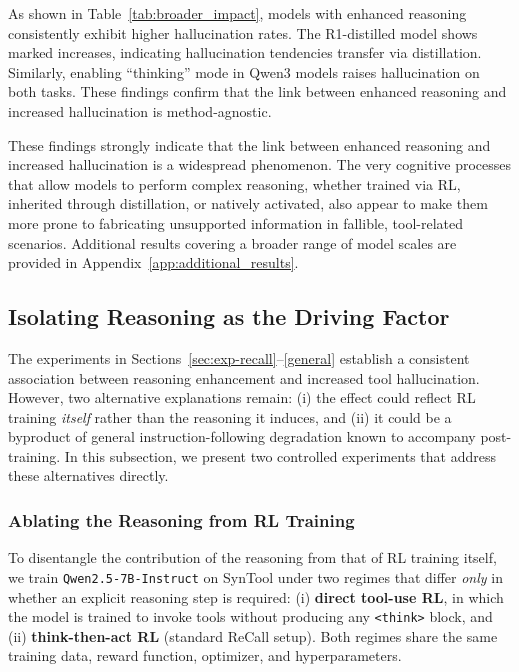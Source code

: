 \documentclass[11pt]{article}
\begin{document}
As shown in Table~\ref{tab:broader_impact}, models with enhanced reasoning consistently exhibit higher hallucination rates. The R1-distilled model shows marked increases, indicating hallucination tendencies transfer via distillation. Similarly, enabling ``thinking'' mode in Qwen3 models raises hallucination on both tasks. These findings confirm that the link between enhanced reasoning and increased hallucination is method-agnostic.

These findings strongly indicate that the link between enhanced reasoning and increased hallucination is a widespread phenomenon. The very cognitive processes that allow models to perform complex reasoning, whether trained via RL, inherited through distillation, or natively activated, also appear to make them more prone to fabricating unsupported information in fallible, tool-related scenarios. Additional results covering a broader range of model scales are provided in Appendix~\ref{app:additional_results}.

\subsection{Isolating Reasoning as the Driving Factor}
\label{sec:isolating}

The experiments in Sections~\ref{sec:exp-recall}--\ref{general} establish a consistent association between reasoning enhancement and increased tool hallucination. However, two alternative explanations remain: (i) the effect could reflect RL training \emph{itself} rather than the reasoning it induces, and (ii) it could be a byproduct of general instruction-following degradation known to accompany post-training. In this subsection, we present two controlled experiments that address these alternatives directly.

\subsubsection{Ablating the Reasoning from RL Training}
\label{sec:no-think-ablation}

To disentangle the contribution of the reasoning from that of RL training itself, we train \texttt{Qwen2.5-7B-Instruct} on SynTool under two regimes that differ \emph{only} in whether an explicit reasoning step is required: (i) \textbf{direct tool-use RL}, in which the model is trained to invoke tools without producing any \texttt{<think>} block, and (ii) \textbf{think-then-act RL} (standard ReCall setup). Both regimes share the same training data, reward function, optimizer, and hyperparameters.
\end{document}
